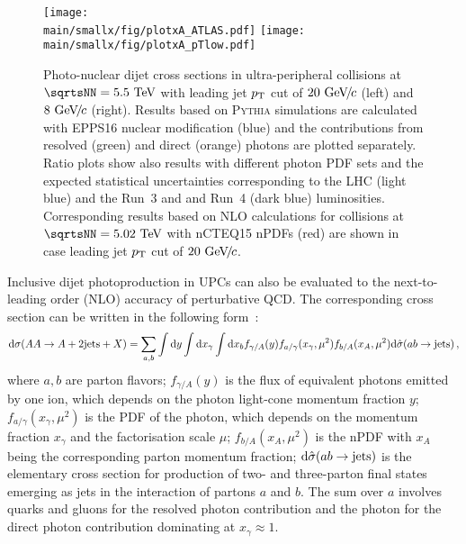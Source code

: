 \documentclass[../report.tex]{subfiles}
\providecommand{\main}{..}
\begin{document}
\begin{figure}
\texttt{[image: \\main/smallx/fig/plotxA\_ATLAS.pdf]}
\texttt{[image: \\main/smallx/fig/plotxA\_pTlow.pdf]}
\caption{Photo-nuclear dijet cross sections in ultra-peripheral \PbPb collisions at $\sqrtsNN = 5.5\UTeV$ with leading jet $p\sb{\scriptstyle\mathrm{T}}$ cut of $20~\text{GeV}\!/\mspace{-2mu}c$ (left) and $8~\text{GeV}\!/\mspace{-2mu}c$ (right). Results based on \textsc{Pythia} simulations are calculated with EPPS16 nuclear modification (blue) and the contributions from resolved (green) and direct (orange) photons are plotted separately. Ratio plots show also results with different photon PDF sets and the expected statistical uncertainties corresponding to the LHC (light blue) and the Run~3 and and Run~4 (dark blue) luminosities. Corresponding results based on NLO calculations for \PbPb collisions at $\sqrtsNN = 5.02\UTeV$ with nCTEQ15 nPDFs (red) are shown in case leading jet $p\sb{\scriptstyle\mathrm{T}}$ cut of $20~\text{GeV}\!/\mspace{-2mu}c$.}
\label{fig:UPCdijetNPDF}
\end{figure}

Inclusive dijet photoproduction in UPCs can also be evaluated to the next-to-leading order (NLO) accuracy of perturbative QCD. The corresponding cross section can be written in the following form~\cite{Klasen:2002xb}:
 \begin{eqnarray}
 \mathrm{d} \sigma(AA \to A+{\rm 2 jets}+X) = \sum_{a,b} \int \mathrm{d} y \int \mathrm{d} x_{\gamma} \int \mathrm{d} x_b f_{\gamma/A}(y)f_{a/\gamma}(x_{\gamma},\mu^2)f_{b/A}(x_A,\mu^2) \mathrm{d} \hat{\sigma}(ab \to {\rm jets}) \,,
\label{eq:cs_jets}
\end{eqnarray}
where $a,b$ are parton flavors; $f_{\gamma/A}(y)$ is the flux of equivalent photons emitted by one ion,
which depends on the photon light-cone momentum fraction $y$;
$f_{a/\gamma}(x_{\gamma},\mu^2)$ is the PDF of the photon, which depends on the momentum fraction $x_{\gamma}$ 
and the factorisation scale $\mu$; $f_{b/A}(x_A,\mu^2)$ is the nPDF with $x_A$ being the corresponding parton momentum fraction;
$\mathrm{d} \hat{\sigma}(ab \to {\rm jets})$ is the elementary cross section for production of two- and three-parton final states emerging as jets
 in the interaction of partons $a$ and $b$. The sum over $a$ involves quarks and gluons for the resolved photon contribution 
 and the photon for the direct photon contribution dominating at $x_{\gamma} \approx 1$.
 
\end{document}
